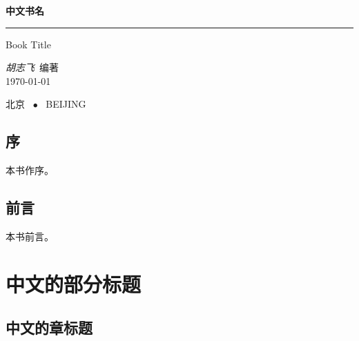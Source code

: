 \documentclass[a4paper,twoside]{ctexbook}
\begin{document}
\begin{titlepage}
  \vspace*{25ex}
  
  \hspace{0.05\textwidth}\begin{minipage}{.9\textwidth}
    \flushright
    
    {\textbf{中文书名}}
    
    \rule[1ex]{\linewidth}{.5pt}
    
    {Book Title} \\
    
    \vspace{20ex}
    
    {\textit{胡志飞}~编著} \\
    
    {\today}
  \end{minipage}
  
  \vfill
  
  \centering
  {北京 ~$\bullet$ ~BEIJING}
\end{titlepage}
\thispagestyle{empty}


\frontmatter


\dominitoc
{}


\chapter*{序}

本书作序。


\chapter*{前言}

本书前言。


{
  \hypersetup{hidelinks}
  \tableofcontents
}


{
  \hypersetup{hidelinks}
  \lstlistoflistings
}


\mainmatter


\part{中文的部分标题}

\chapter{中文的章标题}
\end{document}

